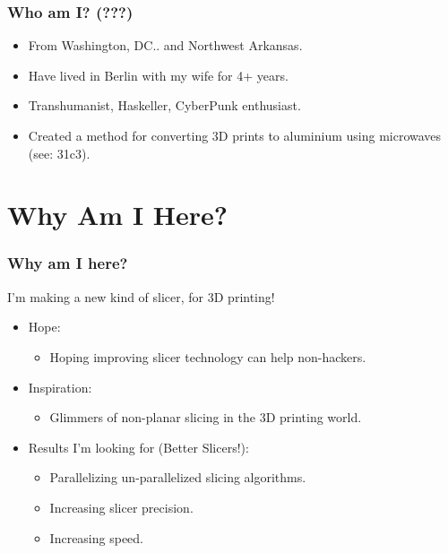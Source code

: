 \documentclass[hyperref={pdfpagemode=FullScreen},aspectratio=169]{beamer}
\begin{document}

\begin{frame}
  \frametitle{Who am I? (???)}
  \begin{itemize}
  \item From Washington, DC.. and Northwest Arkansas.
  \item Have lived in Berlin with my wife for 4+ years.
  \item Transhumanist, Haskeller, CyberPunk enthusiast.
  \item Created a method for converting 3D prints to aluminium using microwaves (see: 31c3).
  \end{itemize}
\end{frame}


\section{Why Am I Here?}

\begin{frame}
  \frametitle{Why am I here?}
    I'm making a new kind of slicer, for 3D printing!
  \begin{itemize}
  \item Hope:
    \begin{itemize}
    \item Hoping improving slicer technology can help non-hackers.
    \end{itemize}
  \item Inspiration:
    \begin{itemize}
    \item Glimmers of non-planar slicing in the 3D printing world.
    \end{itemize}
  \item Results I'm looking for (Better Slicers!):
    \begin{itemize}
    \item Parallelizing un-parallelized slicing algorithms.
    \item Increasing slicer precision.
    \item Increasing speed.
    \end{itemize}
  \end{itemize}
\end{frame}
\end{document}
